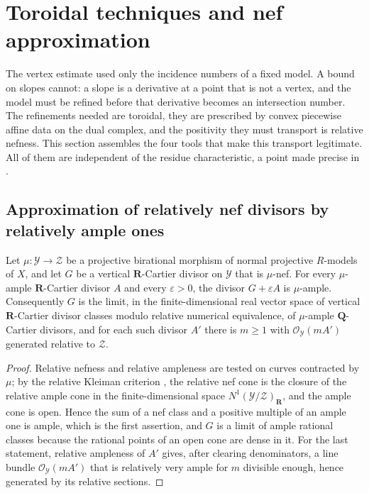 \section{Toroidal techniques and nef approximation}
\label{sec:ch22-toroidal}

The vertex estimate used only the incidence numbers of a fixed model.  A
bound on slopes cannot: a slope is a derivative at a point that is not a
vertex, and the model must be refined before that derivative becomes an
intersection number.  The refinements needed are toroidal, they are
prescribed by convex piecewise affine data on the dual complex, and the
positivity they must transport is relative nefness.  This section assembles
the four tools that make this transport legitimate.  All of them are
independent of the residue characteristic, a point made precise in
.

\subsection{Approximation of relatively nef divisors by relatively ample ones}

\begin{lemma}
\label{lem:ch22-nef-approximation}
Let $\mu:\mathcal Y\to\mathcal Z$ be a projective birational morphism of
normal projective $R$-models of $X$, and let $G$ be a vertical
$\mathbf R$-Cartier divisor on $\mathcal Y$ that is $\mu$-nef.  For
every $\mu$-ample $\mathbf R$-Cartier divisor $A$ and every
$\varepsilon>0$, the divisor $G+\varepsilon A$ is $\mu$-ample.
Consequently $G$ is the limit, in the finite-dimensional real vector space
of vertical $\mathbf R$-Cartier divisor classes modulo relative numerical
equivalence, of $\mu$-ample $\mathbf Q$-Cartier divisors, and for each
such divisor $A'$ there is $m\geq1$ with
$\mathcal O_{\mathcal Y}(mA')$ generated relative to $\mathcal Z$.
\end{lemma}

\begin{proof}
Relative nefness and relative ampleness are tested on curves contracted by
$\mu$; by the relative Kleiman criterion \cite[Section~1.4]{KM08}, the
relative nef cone is the closure of the relative ample cone in the
finite-dimensional space $N^1(\mathcal Y/\mathcal Z)_{\mathbf R}$, and the
ample cone is open.  Hence the sum of a nef class and a positive multiple of
an ample one is ample, which is the first assertion, and $G$ is a limit of
ample rational classes because the rational points of an open cone are dense
in it.  For the last statement, relative ampleness of $A'$ gives, after
clearing denominators, a line bundle $\mathcal O_{\mathcal Y}(mA')$ that is
relatively very ample for $m$ divisible enough, hence generated by its
relative sections.
\end{proof}


